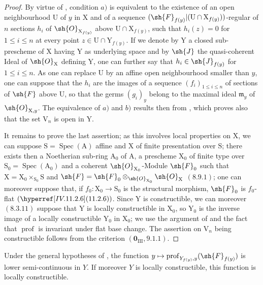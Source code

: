 \begin{proof}
By virtue of , condition $a)$ is equivalent to the existence of an open neighbourhood $\mathrm{U}$ of $y$ in $\mathrm{X}$ and of a sequence $(\sh{F}_{f(y)}|(\mathrm{U}\cap\mathrm{X}_{f(y)}))$-regular of $n$ sections $h_i$ of $\sh{O}_{\mathrm{X}_{f(y)}}$ above $\mathrm{U}\cap\mathrm{X}_{f(y)}$, such that $h_i(z)=0$ for $1\leqslant i\leqslant n$ at every point $z\in\mathrm{U}\cap\mathrm{Y}_{f(y)}$. If we denote by $\mathrm{Y}$ a closed sub-prescheme of $\mathrm{X}$ having $\mathrm{Y}$ as underlying space and by $\sh{J}$ the quasi-coherent Ideal of $\sh{O}_\mathrm{X}$ defining $\mathrm{Y}$, one can further say that $h_i\in\sh{J}_{f(y)}$ for $1\leqslant i\leqslant n$. As one can replace $\mathrm{U}$ by an affine open neighbourhood smaller than $y$, one can suppose that the $h_i$ are the images of a sequence $(f_i)_{1\leqslant i\leqslant n}$ of sections of $\sh{F}$ above $\mathrm{U}$, so that the germs $(g_i)_y$ belong to the maximal ideal $\mathfrak{m}_y$ of $\sh{O}_{\mathrm{X},y}$. The equivalence of $a)$ and $b)$ results then from , which proves also that the set $\mathrm{V}_n$ is open in $\mathrm{Y}$.

It remains to prove the last assertion; as this involves local properties on $\mathrm{X}$, we can suppose $\mathrm{S}=\operatorname{Spec}(\mathrm{A})$ affine and $\mathrm{X}$ of finite presentation over $\mathrm{S}$; there exists then a Noetherian sub-ring $\mathrm{A}_0$ of $\mathrm{A}$, a prescheme $\mathrm{X}_0$ of finite type over $\mathrm{S}_0=\operatorname{Spec}(\mathrm{A}_0)$ and a coherent $\sh{O}_{\mathrm{X}_0}$-Module $\sh{F}_0$ such that $\mathrm{X}=\mathrm{X}_0\times_{\mathrm{S}_0}\mathrm{S}$ and $\sh{F}=\sh{F}_0\otimes_{\sh{O}_{\mathrm{X}_0}}\sh{O}_\mathrm{X}$ $(8.9.1)$; one can moreover suppose that, if $f_0:\mathrm{X}_0\to\mathrm{S}_0$ is the structural morphism, $\sh{F}_0$ is $f_0$-flat $(\sref{IV.11.2.6})$. Since $\mathrm{Y}$ is constructible, we can moreover $(8.3.11)$ suppose that $\mathrm{Y}$ is locally constructible in $\mathrm{X}_0$, so $\mathrm{Y}_0$ is the inverse image of a locally constructible $\mathrm{Y}_0$ in $\mathrm{X}_0$; we use the argument of  and the fact that $\operatorname{prof}$ is invariant under flat base change. The assertion on $\mathrm{V}_n$ being constructible follows from the criterion $(\mathbf{0}_\mathrm{III},9.1.1)$.
\end{proof}

\begin{corollary}[19.9.7]
\label{IV.19.9.7}
Under the general hypotheses of , the function $y\mapsto\operatorname{prof}_{Y_{f(y)},y}(\sh{F}_{f(y)})$ is lower semi-continuous in $Y$.
If moreover $Y$ is locally constructible, this function is locally constructible.
\end{corollary}

